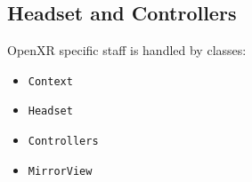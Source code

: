 \newpage
\subsection{Headset and Controllers}
\label{sec:headset}
OpenXR specific staff is handled by classes:
\begin{itemize}
    \item \texttt{Context}
    \item \texttt{Headset}
    \item \texttt{Controllers}
    \item \texttt{MirrorView}
\end{itemize}